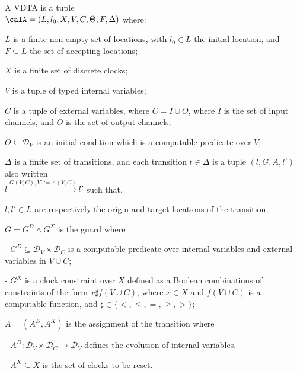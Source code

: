\begin{definition}
	\label{def:ptav}
	A {VDTA} is a tuple \\
	$\calA = \left(L, {l_0}, X, V, C, \Theta, F,  \Delta \right)$ where:
	\squishlist
	\item $L$ is a finite non-empty set of locations, with $l_0 \in L$ the initial location, and $F \subseteq L$ the set of accepting locations;
	\item $X$ is a finite set of discrete clocks;
	\item $V$ is a tuple of typed internal variables; 
	\item $C$ is a tuple of external variables, where $C = I \cup O$, where $I$ is the set of input channels, and $O$ is the set of output channels; 
	\item $\Theta\subseteq {\mathcal D}_{V }$ is an initial condition which is a computable predicate over $V$;
	\item $\Delta$ is a finite set of transitions, and each transition $t \in \Delta$ is a tuple $( l, G, A, l' )$
	also written\\
	$l \xrightarrow{G(V,C), V':=A(V,C)} l'$
	such that,
	\squishlist
	\item[\textbullet] $l, l' \in L$ are respectively the origin and target locations of the transition;
	\item[\textbullet] $G = G^D \wedge G^X$ is the guard where
	\squishlist
	\item[-] $G^D \subseteq {\mathcal D}_V \times {\mathcal D}_{C}$
	is a computable predicate over internal variables and external variables  in $V \cup C$;
	\item[-] $G^X$ is a clock constraint over $X$ defined as a Boolean combinations of constraints of the form $x \sharp f(V \cup C)$, where $x \in X$ and $f(V \cup C)$ is a computable function, and $\sharp \in \{ <, \leq, =, \geq, > \}$;
	\squishend
	\item[\textbullet] $A$$=$$(A^D, A^X)$ is the assignment of the transition where
	\squishlist
	\item[-] $A^D :{\mathcal D}_V \times {\mathcal D}_{C} \rightarrow {\mathcal D}_V$ defines the evolution of internal variables.
	\item[-] $A^X \subseteq X$ is the set of clocks to be reset.
	\squishend
	\squishend
	\squishend
\end{definition}
%

